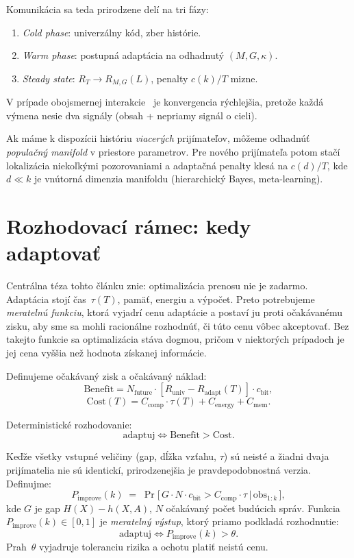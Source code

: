 \documentclass[11pt,a4paper]{article}
\begin{document}
Komunikácia sa teda prirodzene delí na tri fázy:
\begin{enumerate}
    \item \emph{Cold phase}: univerzálny kód, zber histórie.
    \item \emph{Warm phase}: postupná adaptácia na odhadnutý
          $(M, G, \kappa)$.
    \item \emph{Steady state}: $R_T \to R_{M,G}(L)$, penalty
          $c(k)/T$ mizne.
\end{enumerate}

V prípade obojsmernej interakcie~\cite{kaspi1985,orlitsky1990} je
konvergencia rýchlejšia, pretože každá výmena nesie dva signály
(obsah + nepriamy signál o cieli).

Ak máme k dispozícii históriu \emph{viacerých} prijímateľov, môžeme
odhadnúť \emph{populačný manifold} v priestore parametrov. Pre nového
prijímateľa potom stačí lokalizácia niekoľkými pozorovaniami
a adaptačná penalty klesá na $c(d)/T$, kde $d \ll k$ je vnútorná
dimenzia manifoldu (hierarchický Bayes, meta-learning).

\section{Rozhodovací rámec: kedy adaptovať}

Centrálna téza tohto článku znie: optimalizácia prenosu nie je
zadarmo. Adaptácia stojí čas~$\tau(T)$, pamäť, energiu a výpočet.
Preto potrebujeme \emph{meratelnú funkciu}, ktorá vyjadrí cenu
adaptácie a postaví ju proti očakávanému zisku, aby sme sa mohli
racionálne rozhodnúť, či túto cenu vôbec akceptovať. Bez takejto
funkcie sa optimalizácia stáva dogmou, pričom v niektorých prípadoch
je jej cena vyššia než hodnota získanej informácie.

Definujeme očakávaný zisk a očakávaný náklad:
\[
    \text{Benefit} = N_{\text{future}} \cdot [R_{\text{univ}} - R_{\text{adapt}}(T)] \cdot c_{\text{bit}},
\]
\[
    \text{Cost}(T) = C_{\text{comp}} \cdot \tau(T) + C_{\text{energy}} + C_{\text{mem}}.
\]

Deterministické rozhodovanie:
\[
    \text{adaptuj} \iff \text{Benefit} > \text{Cost}.
\]

Keďže všetky vstupné veličiny (gap, dĺžka vzťahu, $\tau$) sú neisté
a žiadni dvaja prijímatelia nie sú identickí, prirodzenejšia je
pravdepodobnostná verzia. Definujme:
\begin{equation}
    P_{\text{improve}}(k)
    \;=\; \Pr\!\big[\,G \cdot N \cdot c_{\text{bit}} > C_{\text{comp}} \cdot \tau
    \,\big|\, \text{obs}_{1:k}\,\big],
    \label{eq:pimprove}
\end{equation}
kde $G$ je gap $H(X) - h(X,A)$, $N$ očakávaný počet budúcich správ.
Funkcia $P_{\text{improve}}(k) \in [0,1]$ je \emph{meratelný výstup},
ktorý priamo podkladá rozhodnutie:
\[
    \text{adaptuj} \iff P_{\text{improve}}(k) > \theta.
\]
Prah~$\theta$ vyjadruje toleranciu rizika a ochotu platiť neistú cenu.
\end{document}
